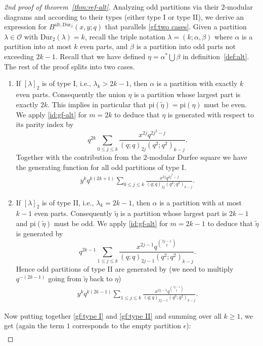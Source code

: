 \documentclass[11pt,reqno]{amsart}
\numberwithin{equation}{section}
\theoremstyle{plain}
\theoremstyle{definition}
\theoremstyle{named}
\def\cO{\mathcal{O}}
\def\la{\lambda}
\def\Dur{\mathrm{Dur}}
\def\alt{\mathrm{alt}}
\def\pai{\mathrm{pi}}
\begin{document}
\begin{proof}[2nd proof of theorem~\ref{thm:ref-alt}]
Analyzing odd partitions via their $2$-modular diagrams and according to their types (either type I or type II), we derive an expression for $B^{\alt,\Dur_2}(x,y;q)$ that parallels \eqref{gf:two cases}. Given a partition $\la\in\cO$ with $\Dur_2(\la)=k$, recall the triple notation $\la=(k;\alpha,\beta)$ where $\alpha$ is a partition into at most $k$ even parts, and $\beta$ is a partition into odd parts not exceeding $2k-1$. Recall that we have defined $\eta=\alpha^*\bigcup\beta$ in definition~\ref{def:alt}. The rest of the proof splits into two cases.
\begin{enumerate}[(1)]
	\item If $[\la]_2$ is of type I, i.e., $\la_k>2k-1$, then $\alpha$ is a partition with exactly $k$ even parts. Consequently the union $\eta$ is a partition whose largest part is exactly $2k$. This implies in particular that $\pai(\tilde{\eta})=\pai(\eta)$ must be even. We apply \eqref{id:gf-alt} for $m=2k$ to deduce that $\eta$ is generated with respect to its parity index by
	$$q^{2k}\sum_{0\le j\le k}\frac{x^{2j}q^{2j^2-j}}{(q;q)_{2j}(q^2;q^2)_{k-j}}.$$
	Together with the contribution from the $2$-modular Durfee square we have the generating function for all odd partitions of type I.
	\begin{align}\label{gf:type I}
	y^{k}q^{k(2k+1)}\sum_{0\le j\le k}\frac{x^{2j}q^{2j^2-j}}{(q;q)_{2j}(q^2;q^2)_{k-j}}.
	\end{align}
	\item If $[\la]_2$ is of type II, i.e., $\la_k=2k-1$, then $\alpha$ is a partition with at most $k-1$ even parts. Consequently $\tilde{\eta}$ is a partition whose largest part is $2k-1$ and $\pai(\tilde{\eta})$ must be odd. We apply \eqref{id:gf-alt} for $m=2k-1$ to deduce that $\tilde{\eta}$ is generated by
	$$q^{2k-1}\sum_{1\le j\le k}\frac{x^{2j-1}q^{\binom{2j-1}{2}}}{(q;q)_{2j-1}(q^2;q^2)_{k-j}}.$$
	Hence odd partitions of type II are generated by (we need to multiply $q^{-(2k-1)}$ going from $\tilde{\eta}$ back to $\eta$)
	\begin{align}\label{gf:type II}
	y^kq^{k(2k-1)}\sum_{1\le j\le k}\frac{x^{2j-1}q^{\binom{2j-1}{2}}}{(q;q)_{2j-1}(q^2;q^2)_{k-j}}.
	\end{align}
\end{enumerate}
Now putting together \eqref{gf:type I} and \eqref{gf:type II} and summing over all $k\ge 1$, we get (again the term $1$ corresponds to the empty partition $\epsilon$):
\begin{align*}

\end{align*}
\end{proof}
\end{document}
